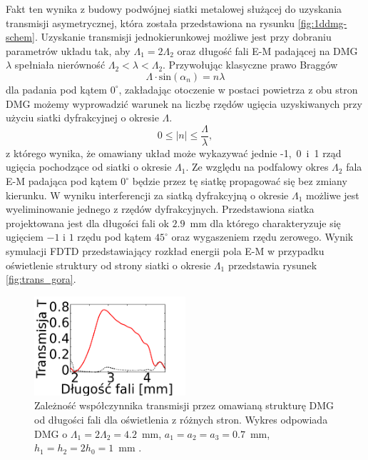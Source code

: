 Fakt ten wynika z budowy podwójnej siatki metalowej służącej do uzyskania transmisji asymetrycznej, która została przedstawiona na rysunku \ref{fig:1ddmg-schem}. Uzyskanie transmisji jednokierunkowej możliwe jest przy dobraniu parametrów układu tak, aby $\Lambda_1 = 2\Lambda_2$ oraz długość fali E-M padającej na DMG  $\lambda$ spełniała nierówność $\Lambda_2<\lambda<\Lambda_2$. Przywołując klasyczne prawo Braggów
\begin{equation}
	\Lambda \cdot \textrm{sin}(\alpha_n) = n \lambda 
\end{equation}
dla padania pod kątem $0^{\circ}$, zakładając otoczenie w postaci powietrza z obu stron DMG możemy wyprowadzić warunek na liczbę rzędów ugięcia uzyskiwanych przy użyciu siatki dyfrakcyjnej o okresie $\Lambda$. 
\begin{equation}
	 0 \le |n| \le \frac { \Lambda }{\lambda},
\end{equation}
z którego wynika, że omawiany układ może wykazywać jednie -1,~0~i~1 rząd ugięcia pochodzące od siatki o okresie $\Lambda_1$. Ze względu na podfalowy okres $\Lambda_2$ fala E-M padająca pod kątem $0^{\circ}$ będzie przez tę siatkę propagować się bez zmiany kierunku.  W wyniku interferencji za siatką dyfrakcyjną o okresie $\Lambda_1$ możliwe jest wyeliminowanie jednego z rzędów dyfrakcyjnych. Przedstawiona siatka projektowana jest dla długości fali ok $2.9$~mm dla którego charakteryzuje się ugięciem $-1$ i $1$ rzędu pod kątem $45^{\circ}$ oraz wygaszeniem rzędu zerowego. Wynik symulacji FDTD przedstawiający rozkład energii pola E-M w przypadku oświetlenie struktury od strony siatki o okresie $\Lambda_1$ przedstawia rysunek \ref{fig:trans_gora}.

\begin{figure}[tb]
	\centering
	\includegraphics[width=0.5\textwidth]{images/thz/opt_lett_spect.png}
	\caption{Zależność współczynnika transmisji przez omawianą strukturę DMG od długości fali dla oświetlenia z różnych stron. Wykres odpowiada DMG o $\Lambda_1= 2 \Lambda_2 = 4.2$~mm, $a_1=a_2=a_3=0.7$~mm, $h_1=h_2=2 h_0=1$~mm \cite{Stolarek:13}.}
	\label{fig:trans_freq}

\end{figure}

